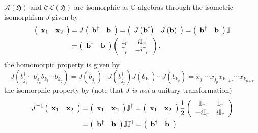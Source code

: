 \documentclass[aps,preprint]{revtex4}%
\begin{document}
$\mathcal{A}\left(  \mathfrak{H}\right)  $ and $\mathcal{CL}\left(
\mathfrak{H}\right)  $ are isomorphic as $\mathbb{C}$-algebras through the
isometric isomorphism $J$ given by
\begin{align}
\left(
\begin{array}
[c]{cc}%
\mathbf{x}_{1} & \mathbf{x}_{2}%
\end{array}
\right)   &  =J\left(
\begin{array}
[c]{cc}%
\mathbf{b}^{\dagger} & \mathbf{b}%
\end{array}
\right)  =\left(
\begin{array}
[c]{cc}%
J\left(  \mathbf{b}^{\dagger}\right)  & J\left(  \mathbf{b}\right)
\end{array}
\right)  =\left(
\begin{array}
[c]{cc}%
\mathbf{b}^{\dagger} & \mathbf{b}%
\end{array}
\right)  \mathbb{J}\\
&  =\left(
\begin{array}
[c]{cc}%
\mathbf{b}^{\dagger} & \mathbf{b}%
\end{array}
\right)  \left(
\begin{array}
[c]{cc}%
\mathbb{I}_{r} & i\mathbb{I}_{r}\\
\mathbb{I}_{r} & -i\mathbb{I}_{r}%
\end{array}
\right)  ,
\end{align}
the homomorpic property is given by
\begin{equation}
J\left(  b_{j_{1}}^{\dagger}\cdots b_{j_{p}}^{\dagger}b_{k_{1}}\cdots
b_{k_{q}}\right)  =J\left(  b_{j_{1}}^{\dagger}\right)  \cdots J\left(
b_{j_{p}}^{\dagger}\right)  J\left(  b_{k_{1}}\right)  \cdots J\left(
b_{k_{q}}\right)  =x_{j_{1}}\cdots x_{j_{p}}x_{k_{1+r}}\cdots x_{k_{p+r}}%
\end{equation}
the isomorphic property by (note that $J$ \emph{is not} a unitary
transformation)
\begin{align}
J^{-1}\left(
\begin{array}
[c]{cc}%
\mathbf{x}_{1} & \mathbf{x}_{2}%
\end{array}
\right)   &  =\left(
\begin{array}
[c]{cc}%
\mathbf{x}_{1} & \mathbf{x}_{2}%
\end{array}
\right)  \mathbb{J}^{\dagger}=\left(
\begin{array}
[c]{cc}%
\mathbf{x}_{1} & \mathbf{x}_{2}%
\end{array}
\right)  \frac{1}{2}\left(
\begin{array}
[c]{cc}%
\mathbb{I}_{r} & \mathbb{I}_{r}\\
-i\mathbb{I}_{r} & i\mathbb{I}_{r}%
\end{array}
\right) \\
&  =\left(
\begin{array}
[c]{cc}%
\mathbf{b}^{\dagger} & \mathbf{b}%
\end{array}
\right)  \mathbb{JJ}^{\dagger}=\left(
\begin{array}
[c]{cc}%
\mathbf{b}^{\dagger} & \mathbf{b}%
\end{array}
\right)
\end{align}
\end{document}
